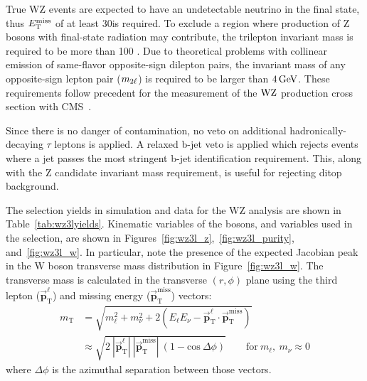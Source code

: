 True WZ events are expected to have an undetectable neutrino in the final state, thus $E_\mathrm{T}^{\mathrm{miss}}$ of at least 30\GeV is required.
To exclude a region where production of Z bosons with final-state radiation may contribute, the trilepton invariant mass is required to be more than 100 \GeV.
Due to theoretical problems with collinear emission of same-flavor opposite-sign dilepton pairs, the invariant mass of any opposite-sign lepton pair ($m_{2\ell}$) is required to be larger than $4\,\text{Ge\hspace{-.08em}V}$.
These requirements follow precedent for the measurement of the $\mathrm{W}\mathrm{Z}$ production cross section with CMS~\cite{Khachatryan:2016tgp}.

Since there is no danger of contamination, no veto on additional hadronically-decaying $\tau$ leptons is applied.
A relaxed b-jet veto is applied which rejects events where a jet passes the most stringent b-jet identification requirement.
This, along with the Z candidate invariant mass requirement, is useful for rejecting ditop background.

The selection yields in simulation and data for the WZ analysis are shown in Table~\ref{tab:wz3lyields}.
Kinematic variables of the bosons, and variables used in the selection, are shown in Figures~\ref{fig:wz3l_z},~\ref{fig:wz3l_purity}, and~\ref{fig:wz3l_w}.
In particular, note the presence of the expected Jacobian peak in the W boson transverse mass distribution in Figure~\ref{fig:wz3l_w}.
The transverse mass is calculated in the transverse $(r,\phi)$ plane using the 
third lepton ($\vec{\mathbf{p}}_\mathrm{T}^\ell$) and missing energy ($\vec{\mathbf{p}}_\mathrm{T}^\mathrm{miss}$) vectors:
\begin{equation}
\label{eq:mt}
\begin{split}
m_\mathrm{T} & = \sqrt{m_\ell^2 + m_\nu^2 + 2(E_\ell E_\nu -\vec{\mathbf{p}}_\mathrm{T}^\ell \cdot \vec{\mathbf{p}}_\mathrm{T}^\mathrm{miss})} \\ 
& \approx \sqrt{2\:|\vec{\mathbf{p}}_\mathrm{T}^\ell|\:|\vec{\mathbf{p}}_\mathrm{T}^\mathrm{miss}|\:(1 - \mathrm{cos}\:\Delta\phi)} \qquad \mathrm{for}\:m_\ell,\:m_\nu\approx0
\end{split}
\end{equation}
where $\Delta\phi$ is the azimuthal separation between those vectors.

